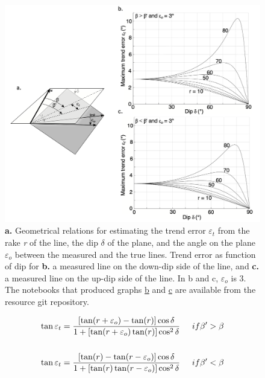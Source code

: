 \documentclass[a4paper , 12pt]{book}
\begin{document}
\begin{figure}[ht]
    \centering
    \includegraphics[width=13cm]{Figures/ch3f7.png}
    \caption{\textbf{a.} Geometrical relations for estimating the trend error $\varepsilon_t$ from the rake \textit{r} of the line, the dip $\delta$  of the plane, and the angle on the plane $\varepsilon_o$ between the measured and the true lines. Trend error as function of dip for \textbf{b.} a measured line on the down-dip side of the line, and \textbf{c.} a measured line on the up-dip side of the line. In b and c, $\varepsilon_o$ is 3\degree. The notebooks that produced graphs \href{https://github.com/nfcd/compGeo/blob/master/source/notebooks/ch3fig7b.ipynb}{b} and \href{https://github.com/nfcd/compGeo/blob/master/source/notebooks/ch3fig7c.ipynb}{c} are available from the resource git repository.}
\end{figure}

\begin{equation}
    \begin{split}
        \tan\varepsilon_t = \frac{[\tan(r+\varepsilon_o)-\tan(r)]\cos\delta}{1+[\tan(r+\varepsilon_o)\tan(r)]\cos^2\delta} \hspace{0.5cm} if \beta\text{$'$}>\beta\\ \\
        \tan\varepsilon_t = \frac{[\tan(r)-\tan(r-\varepsilon_o)]\cos\delta}{1+[\tan(r)\tan(r-\varepsilon_o)]\cos^2\delta} \hspace{0.5cm} if \beta\text{$'$}<\beta
    \end{split}
\end{equation}
\end{document}
